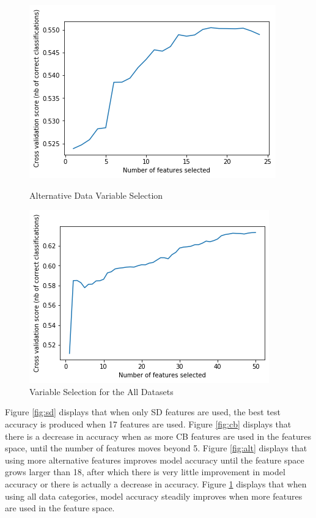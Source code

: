 \begin{figure}[!htb]
\centering
  \begin{minipage}{0.5\textwidth}
    \includegraphics[width=\textwidth]{images/alt_only.png}
    \caption{Alternative Data Variable Selection}
    \label{fig:alt}
  \end{minipage}%
  \begin{minipage}{0.5\textwidth}
    \includegraphics[width=\textwidth]{images/all_feats.png}
    \caption{Variable Selection for the All Datasets}
    \label{fig:all}
  \end{minipage}
\end{figure}

\vspace{10 pt}

Figure \ref{fig:sd} displays that when only SD features are used, the best test accuracy is produced when 17 features are used. Figure \ref{fig:cb} displays that there is a decrease in accuracy when as more CB features are used in the features space, until the number of features moves beyond 5. Figure \ref{fig:alt} displays that using more alternative features improves model accuracy until the feature space grows larger than 18, after which there is very little improvement in model accuracy or there is actually a decrease in accuracy. Figure \ref{fig:all} displays that when using all data categories, model accuracy steadily improves when more features are used in the feature space. \\

